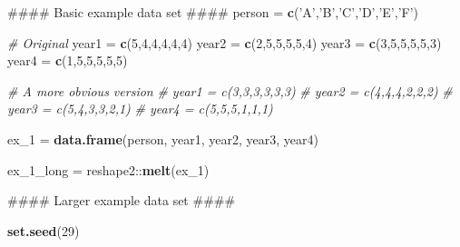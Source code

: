 \documentclass[]{book}
\newenvironment{Shaded}{\begin{snugshade}}{\end{snugshade}}
\newcommand{\KeywordTok}[1]{\textcolor[rgb]{0.13,0.29,0.53}{\textbf{{#1}}}}
\newcommand{\DecValTok}[1]{\textcolor[rgb]{0.00,0.00,0.81}{{#1}}}
\newcommand{\StringTok}[1]{\textcolor[rgb]{0.31,0.60,0.02}{{#1}}}
\newcommand{\CommentTok}[1]{\textcolor[rgb]{0.56,0.35,0.01}{\textit{{#1}}}}
\newcommand{\NormalTok}[1]{{#1}}
\begin{document}
\begin{Shaded}
\begin{Highlighting}[]
\NormalTok{#### Basic example data set ####}
\NormalTok{person =}\StringTok{ }\KeywordTok{c}\NormalTok{(}\StringTok{'A'}\NormalTok{,}\StringTok{'B'}\NormalTok{,}\StringTok{'C'}\NormalTok{,}\StringTok{'D'}\NormalTok{,}\StringTok{'E'}\NormalTok{,}\StringTok{'F'}\NormalTok{)}

\CommentTok{# Original }
\NormalTok{year1 =}\StringTok{ }\KeywordTok{c}\NormalTok{(}\DecValTok{5}\NormalTok{,}\DecValTok{4}\NormalTok{,}\DecValTok{4}\NormalTok{,}\DecValTok{4}\NormalTok{,}\DecValTok{4}\NormalTok{,}\DecValTok{4}\NormalTok{)}
\NormalTok{year2 =}\StringTok{ }\KeywordTok{c}\NormalTok{(}\DecValTok{2}\NormalTok{,}\DecValTok{5}\NormalTok{,}\DecValTok{5}\NormalTok{,}\DecValTok{5}\NormalTok{,}\DecValTok{5}\NormalTok{,}\DecValTok{4}\NormalTok{)}
\NormalTok{year3 =}\StringTok{ }\KeywordTok{c}\NormalTok{(}\DecValTok{3}\NormalTok{,}\DecValTok{5}\NormalTok{,}\DecValTok{5}\NormalTok{,}\DecValTok{5}\NormalTok{,}\DecValTok{5}\NormalTok{,}\DecValTok{3}\NormalTok{)}
\NormalTok{year4 =}\StringTok{ }\KeywordTok{c}\NormalTok{(}\DecValTok{1}\NormalTok{,}\DecValTok{5}\NormalTok{,}\DecValTok{5}\NormalTok{,}\DecValTok{5}\NormalTok{,}\DecValTok{5}\NormalTok{,}\DecValTok{5}\NormalTok{)}

\CommentTok{# A more obvious version}
\CommentTok{# year1 = c(3,3,3,3,3,3)}
\CommentTok{# year2 = c(4,4,4,2,2,2)}
\CommentTok{# year3 = c(5,4,3,3,2,1)}
\CommentTok{# year4 = c(5,5,5,1,1,1)}
 
\NormalTok{ex_1 =}\StringTok{ }\KeywordTok{data.frame}\NormalTok{(person, year1, year2, year3, year4)}
 
\NormalTok{ex_1_long =}\StringTok{ }\NormalTok{reshape2::}\KeywordTok{melt}\NormalTok{(ex_1)}

\NormalTok{#### Larger example data set ####}

\KeywordTok{set.seed}\NormalTok{(}\DecValTok{29}\NormalTok{)}


\end{Highlighting}
\end{Shaded}
\end{document}
